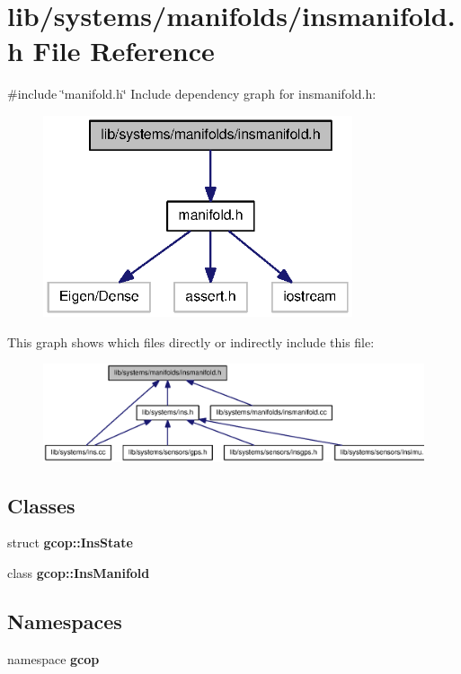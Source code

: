 \section{lib/systems/manifolds/insmanifold.h \-File \-Reference}
\label{insmanifold_8h}
{\ttfamily \#include \char`\"{}manifold.\-h\char`\"{}}\*
\-Include dependency graph for insmanifold.\-h\-:\nopagebreak
\begin{figure}[H]
\begin{center}
\leavevmode
\includegraphics[width=258pt]{insmanifold_8h__incl}
\end{center}
\end{figure}
\-This graph shows which files directly or indirectly include this file\-:\nopagebreak
\begin{figure}[H]
\begin{center}
\leavevmode
\includegraphics[width=350pt]{insmanifold_8h__dep__incl}
\end{center}
\end{figure}
\subsection*{\-Classes}
\begin{DoxyCompactItemize}
\item 
struct {\bf gcop\-::\-Ins\-State}
\item 
class {\bf gcop\-::\-Ins\-Manifold}
\end{DoxyCompactItemize}
\subsection*{\-Namespaces}
\begin{DoxyCompactItemize}
\item 
namespace {\bf gcop}
\end{DoxyCompactItemize}
